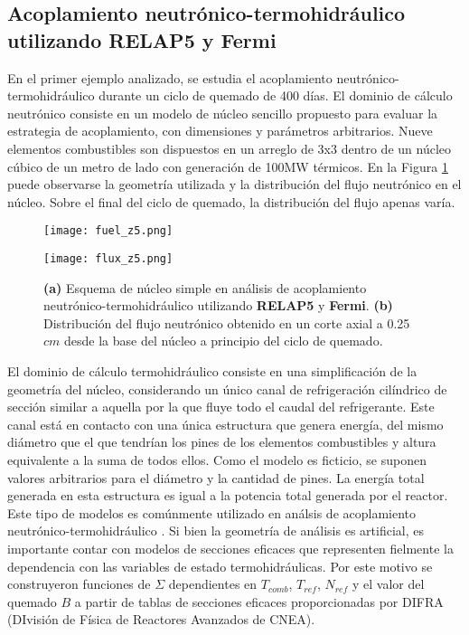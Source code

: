 \subsection*{Acoplamiento neutrónico-termohidráulico utilizando \textbf{RELAP5} y \textbf{Fermi}}
\label{3:relap-fermi}

En el primer ejemplo analizado, se estudia el acoplamiento neutrónico-termohidráulico durante un ciclo de quemado de 400 días.
El dominio de cálculo neutrónico consiste en un modelo de núcleo sencillo propuesto para evaluar la estrategia de acoplamiento,
con dimensiones y parámetros arbitrarios.
Nueve elementos combustibles son dispuestos en un arreglo de 3x3 dentro de un núcleo cúbico de un metro de lado con generación de 100MW térmicos.
En la Figura \ref{fuel_z5} puede observarse la geometría utilizada y la distribución del flujo neutrónico en el núcleo.
Sobre el final del ciclo de quemado, la distribución del flujo apenas varía.

\begin{figure}[ht]
	\begin{minipage}{0.5\linewidth}
		\centering
		\texttt{[image: fuel\_z5.png]}
	\end{minipage}
	\begin{minipage}{0.5\linewidth}
		\centering
		\texttt{[image: flux\_z5.png]}
	\end{minipage}
\caption[Núcleo simple en análisis de acoplamiento neutrónico-termohidráulico utilizando \textit{RELAP5} y \textit{Fermi}]
{\textbf{(a)} Esquema de núcleo simple en análisis de acoplamiento neutrónico-termohidráulico utilizando \textbf{RELAP5} y \textbf{Fermi}.
\textbf{(b)} Distribución del flujo neutrónico obtenido en un corte axial a 0.25 $cm$ desde la base del núcleo a principio del ciclo de quemado.
}
\label{fuel_z5}
\end{figure}
El dominio de cálculo termohidráulico consiste en una simplificación de la geometría del núcleo,
considerando un único canal de refrigeración cilíndrico de sección similar a aquella por la que fluye todo el caudal del refrigerante.
Este canal está en contacto con una única estructura que genera energía, 
del mismo diámetro que el que tendrían los pines de los elementos combustibles y altura equivalente a la suma de todos ellos.
Como el modelo es ficticio, se suponen valores arbitrarios para el diámetro y la cantidad de pines.
La energía total generada en esta estructura es igual a la potencia total generada por el reactor. 
Este tipo de modelos es comúnmente utilizado en análsis de acoplamiento neutrónico-termohidráulico \cite{pumita-relap}.
Si bien la geometría de análisis es artificial, 
es importante contar con modelos de secciones eficaces que representen fielmente la dependencia con las variables de estado termohidráulicas.
Por este motivo se construyeron funciones de $\Sigma$ dependientes en $T_{comb}$, $T_{ref}$, $N_{ref}$ y el valor del quemado $B$
a partir de tablas de secciones eficaces proporcionadas por DIFRA (DIvisión de Física de Reactores Avanzados de CNEA).

